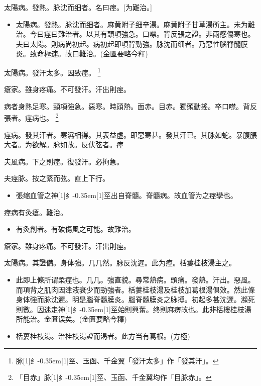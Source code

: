 \documentclass[oneside,b4paper]{ctexbook}
\begin{document}
\begin{flushleft}
太陽病。發熱。脉沈而细者。名曰痙。[为難治。]

\begin{itemize}
\item 太陽病。發熱。脉沈而细者。麻黄附子细辛湯。麻黄附子甘草湯所主。未为難治。今曰痙曰難治者。以其有頭項強急。口噤。背反張之證。非兩感傷寒也。夫曰太陽。則病尚初起。病初起即項背勁強。脉沈而细者。乃惡性腦脊髓膜炎。致命極速。故曰難治。(金匱要略今釋)
\end{itemize}

太陽病。發汗太多。因致痙。
\footnote{脉{\hbox{\scalebox{0.68}[1]{纟}\kern-0.35em\scalebox{0.64}[1]{巠}}}、玉函、千金翼「發汗太多」作「發其汗」。}

瘡家。雖身疼痛。不可發汗。汗出則痙。

病者身熱足寒。頸項強急。惡寒。時頭熱。面赤。目赤。獨頭動搖。卒口噤。背反張者。痙病也。
\footnote{「目赤」脉{\hbox{\scalebox{0.68}[1]{纟}\kern-0.35em\scalebox{0.64}[1]{巠}}}、玉函、千金翼均作「目脉赤」。}

痙病。發其汗者。寒濕相得。其表益虛。即惡寒甚。發其汗已。其脉如蛇。暴腹脹大者。为欲解。脉如故。反伏弦者。痙

夫風病。下之則痙。復發汗。必拘急。

夫痙脉。按之緊而弦。直上下行。

\begin{itemize}
\item 張缩血管之神{\hbox{\scalebox{0.68}[1]{纟}\kern-0.35em\scalebox{0.64}[1]{巠}}}出自脊髓。脊髓病。故血管为之痙孿也。
\end{itemize}

痙病有灸瘡。難治。

\begin{itemize}
\item 有灸創者。有破傷風之可能。故難治。
\end{itemize}

瘡家。雖身疼痛。不可發汗。汗出則痙。

太陽病。其證備。身体強。几几然。脉反沈遲。此为痙。栝蔞桂枝湯主之。

\begin{itemize}
\item 此即上條所谓柔痙也。几几。強直貌。尋常熱病。頭痛。發熱。汗出。惡風。而項背之肌肉因津液衰少而勁強者。栝蔞桂枝湯及桂枝加葛根湯俱效。然此條身体強而脉沈遲。明是腦脊髓膜炎。腦脊髓膜炎之脉搏。初起多甚沈遲。瀕死則數。因迷走神{\hbox{\scalebox{0.68}[1]{纟}\kern-0.35em\scalebox{0.64}[1]{巠}}}始則興奮。终則麻痹故也。此非栝樓桂枝湯所能治。金匱误矣。(金匱要略今釋)
\item 栝蔞桂枝湯。治桂枝湯證而渴者。此方当有葛根。(方極)
\end{itemize}


\end{flushleft}
\end{document}

